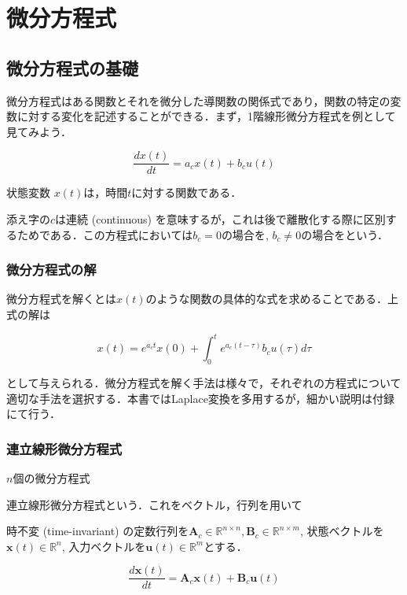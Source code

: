 \section{微分方程式}
\subsection{微分方程式の基礎}
微分方程式はある関数とそれを微分した導関数の関係式であり，関数の特定の変数に対する変化を記述することができる．まず，1階線形微分方程式を例として見てみよう．


\begin{equation}
\frac{dx(t)}{dt}=a_c x(t)+b_c u(t)
\end{equation}


状態変数 $x(t)$は，時間$t$に対する関数である．

添え字の$c$は連続 (continuous) を意味するが，これは後で離散化する際に区別するためである．この方程式においては$b_c=0$の場合を\textbf{}, $b_c\neq 0$の場合を\textbf{}という．

\subsubsection{微分方程式の解}
微分方程式を解くとは$x(t)$のような関数の具体的な式を求めることである．上式の解は


\begin{equation}
x(t)=e^{a_c t}x(0)+\int_0^t e^{a_c (t-\tau)}b_c u(\tau) d\tau
\end{equation}


として与えられる．微分方程式を解く手法は様々で，それぞれの方程式について適切な手法を選択する．本書ではLaplace変換を多用するが，細かい説明は付録にて行う．

\subsubsection{連立線形微分方程式}
$n$個の微分方程式

連立線形微分方程式という．これをベクトル，行列を用いて

時不変 (time-invariant) の定数行列を$\mathbf{A}_c \in \mathbb{R}^{n\times n}, \mathbf{B}_c \in \mathbb{R}^{n\times m}$, 状態ベクトルを$\mathbf{x}(t)\in\mathbb{R}^n$, 入力ベクトルを$\mathbf{u}(t)\in\mathbb{R}^m$とする．


\begin{equation}
\frac{d\mathbf{x}(t)}{dt} = \mathbf{A}_c\mathbf{x}(t) + \mathbf{B}_c\mathbf{u}(t)
\end{equation}


